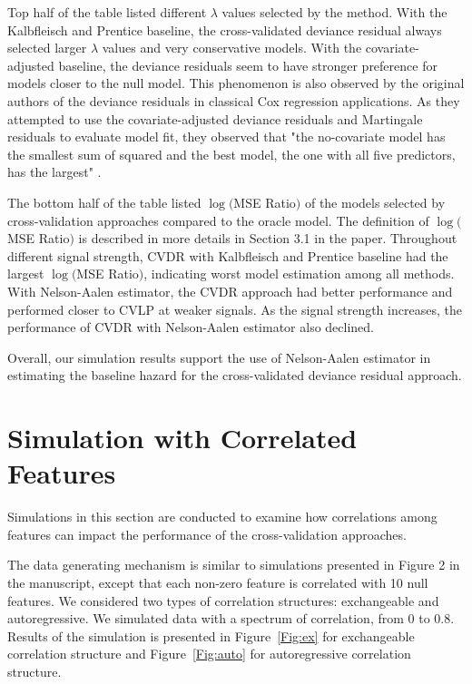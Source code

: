 \documentclass{article}
\begin{document}
Top half of the table listed different $\lambda$ values selected by the method. With the Kalbfleisch and Prentice baseline, the cross-validated deviance residual always selected larger $\lambda$ values and very conservative models. With the covariate-adjusted baseline, the deviance residuals seem to have stronger preference for models closer to the null model. This phenomenon is also observed by the original authors of the deviance residuals in classical Cox regression applications. As they attempted to use the covariate-adjusted deviance residuals and Martingale residuals to evaluate model fit, they observed that "the no-covariate model has the smallest sum of squared and the best model, the one with all five predictors, has the largest" \citep{Therneau2000modeling}.

The bottom half of the table listed $\log($MSE Ratio$)$ of the models selected by cross-validation approaches compared to the oracle model. The definition of $\log($MSE Ratio$)$ is described in more details in Section 3.1 in the paper. Throughout different signal strength, CVDR with Kalbfleisch and Prentice baseline had the largest $\log($MSE Ratio$)$, indicating worst model estimation among all methods. With Nelson-Aalen estimator, the CVDR approach had better performance and performed closer to CVLP at weaker signals. As the signal strength increases, the performance of CVDR with Nelson-Aalen estimator also declined.

Overall, our simulation results support the use of Nelson-Aalen estimator in estimating the baseline hazard for the cross-validated deviance residual approach.

\section{Simulation with Correlated Features}

Simulations in this section are conducted to examine how correlations among features can impact the performance of the cross-validation approaches.

The data generating mechanism is similar to simulations presented in Figure 2 in the manuscript, except that each non-zero feature is correlated with 10 null features. We considered two types of correlation structures: exchangeable and autoregressive. We simulated data with a spectrum of correlation, from 0 to 0.8. Results of the simulation is presented in Figure~\ref{Fig:ex} for exchangeable correlation structure and Figure~\ref{Fig:auto} for autoregressive correlation structure.
\end{document}
